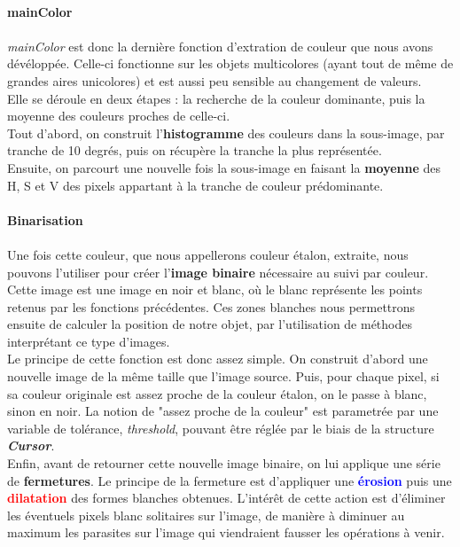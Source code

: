 \documentclass{report}
\begin{document}
						\paragraph{mainColor} \paragraph{}
						\textit{mainColor} est donc la dernière fonction d'extration de couleur que nous avons dévéloppée. Celle-ci fonctionne sur les objets multicolores (ayant tout de même de grandes aires unicolores) et est aussi peu sensible au changement de valeurs.\\
						Elle se déroule en deux étapes : la recherche de la couleur dominante, puis la moyenne des couleurs proches de celle-ci. \\Tout d'abord, on construit l'\textbf{histogramme} des couleurs dans la sous-image, par tranche de 10 degrés, puis on récupère la tranche la plus représentée.\\
Ensuite, on parcourt une nouvelle fois la sous-image en faisant la \textbf{moyenne} des H, S et V des pixels appartant à la tranche de couleur prédominante.

						
						\paragraph{Binarisation} \paragraph{}
							Une fois cette couleur, que nous appellerons couleur étalon, extraite, nous pouvons l'utiliser pour créer l'\textbf{image binaire} nécessaire au suivi par couleur. Cette image est une image en noir et blanc, où le blanc représente les points retenus par les fonctions précédentes. Ces zones blanches nous permettrons ensuite de calculer la position de notre objet, par l'utilisation de méthodes interprétant ce type d'images.\\
							Le principe de cette fonction est donc assez simple. On construit d'abord une nouvelle image de la même taille que l'image source. Puis, pour chaque pixel, si sa couleur originale est assez proche de la couleur étalon, on le passe à blanc, sinon en noir. La notion de "assez proche de la couleur" est parametrée par une variable de tolérance, \textit{threshold}, pouvant être réglée par le biais de la structure \textbf{\textit{Cursor}}.\\
							Enfin, avant de retourner cette nouvelle image binaire, on lui applique une série de \textbf{fermetures}. Le principe de la fermeture est d'appliquer une \textbf{\textcolor{blue}{érosion}} puis une \textbf{\textcolor{red}{dilatation}} des formes blanches obtenues. L'intérêt de cette action est d'éliminer les éventuels pixels blanc solitaires sur l'image, de manière à diminuer au maximum les parasites sur l'image qui viendraient fausser les opérations à venir.
					\newpage
\end{document}
